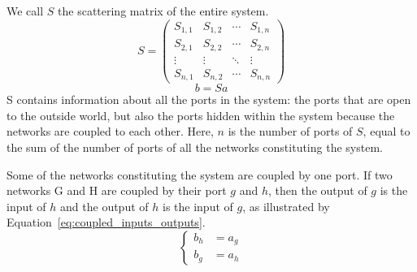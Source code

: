 We call $S$ the scattering matrix of the entire system.
\begin{equation*}
    S =
    \begin{pmatrix}
        S_{1, 1} & S_{1, 2} & \cdots & S_{1, n} \\
        S_{2, 1} & S_{2, 2} & \cdots & S_{2, n} \\
        \vdots   & \vdots   & \ddots & \vdots \\
        S_{n, 1} & S_{n, 2} & \cdots & S_{n, n}
    \end{pmatrix}
\end{equation*}
\begin{equation*}
    b = Sa
\end{equation*}
S contains information about all the ports in the system: the ports that are open to the outside world, but also the ports hidden within the system because the networks are coupled to each other.
Here, $n$ is the number of ports of $S$, equal to the sum of the number of ports of all the networks constituting the system.

Some of the networks constituting the system are coupled by one port.
If two networks G and H are coupled by their port $g$ and $h$, then the output of $g$ is the input of $h$ and the output of $h$ is the input of $g$, as illustrated by Equation~\eqref{eq:coupled_inputs_outputs}.
\begin{equation}
    \left\lbrace
    \begin{aligned}
        b_h &= a_g \\
        b_g &= a_h
    \end{aligned}
    \right.
    \label{eq:coupled_inputs_outputs}
\end{equation}

